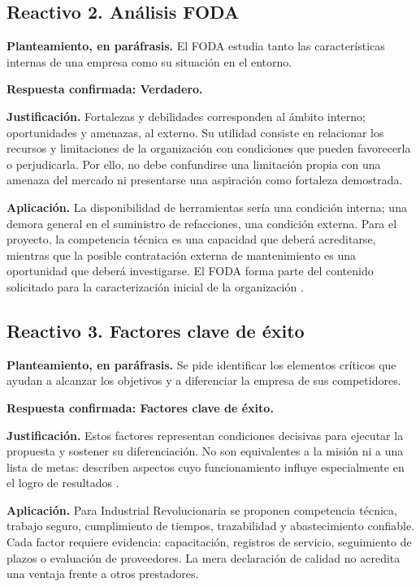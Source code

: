{\subsection{Reactivo 2. Análisis FODA}

\textbf{Planteamiento, en paráfrasis.} El FODA estudia tanto las características internas de una empresa como su situación en el entorno.

\textbf{Respuesta confirmada: Verdadero.}

\textbf{Justificación.} Fortalezas y debilidades corresponden al ámbito interno; oportunidades y amenazas, al externo. Su utilidad consiste en relacionar los recursos y limitaciones de la organización con condiciones que pueden favorecerla o perjudicarla. Por ello, no debe confundirse una limitación propia con una amenaza del mercado ni presentarse una aspiración como fortaleza demostrada.

\textbf{Aplicación.} La disponibilidad de herramientas sería una condición interna; una demora general en el suministro de refacciones, una condición externa. Para el proyecto, la competencia técnica es una capacidad que deberá acreditarse, mientras que la posible contratación externa de mantenimiento es una oportunidad que deberá investigarse. El FODA forma parte del contenido solicitado para la caracterización inicial de la organización \citep{velazquezCompetencia1}.

\subsection{Reactivo 3. Factores clave de éxito}

\textbf{Planteamiento, en paráfrasis.} Se pide identificar los elementos críticos que ayudan a alcanzar los objetivos y a diferenciar la empresa de sus competidores.

\textbf{Respuesta confirmada: Factores clave de éxito.}

\textbf{Justificación.} Estos factores representan condiciones decisivas para ejecutar la propuesta y sostener su diferenciación. No son equivalentes a la misión ni a una lista de metas: describen aspectos cuyo funcionamiento influye especialmente en el logro de resultados \citep{planNegociosGlosario2024}.

\textbf{Aplicación.} Para Industrial Revolucionaria se proponen competencia técnica, trabajo seguro, cumplimiento de tiempos, trazabilidad y abastecimiento confiable. Cada factor requiere evidencia: capacitación, registros de servicio, seguimiento de plazos o evaluación de proveedores. La mera declaración de calidad no acredita una ventaja frente a otros prestadores.

}

